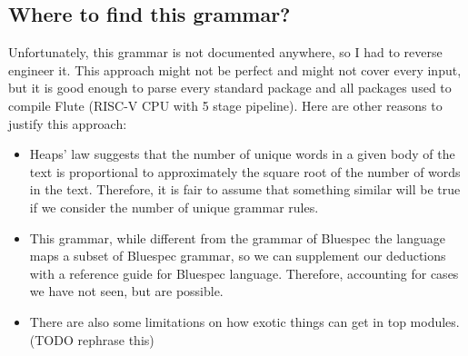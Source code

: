 \documentclass[12pt]{report}
\begin{document}
\subsection{Where to find this grammar?}  
Unfortunately, this grammar is not documented anywhere, so I had to reverse engineer it. This approach might not be perfect and might not cover every input, but it is good enough to parse every standard package and all packages used to compile Flute (RISC-V CPU with 5 stage pipeline).  
Here are other reasons to justify this approach:  
\begin{itemize}  
   \item Heaps' law suggests that the number of unique words in a given body of the text is proportional to approximately the square root of the number of words in the text. Therefore, it is fair to assume that something similar will be true if we consider the number of unique grammar rules.  
   \item This grammar, while different from the grammar of Bluespec the language maps a subset of Bluespec grammar, so we can supplement our deductions with a reference guide for Bluespec language. Therefore, accounting for cases we have not seen, but are possible.  
   \item There are also some limitations on how exotic things can get in top modules. (TODO rephrase this)  
\end{itemize}
\end{document}
